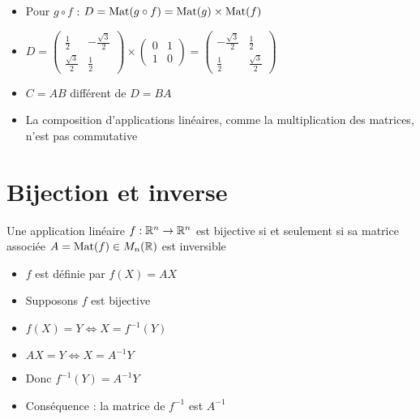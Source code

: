 \begin{frame}
\begin{exemple}
\begin{itemize}[<+->]\setlength{\itemsep}{8pt}
  \item Pour $g\circ f$ : $D = \mathop{\text{Mat}}\nolimits (g \circ f)  = \mathop{\text{Mat}}\nolimits (g) \times \mathop{\text{Mat}}\nolimits (f)$
  \item $D = \begin{pmatrix} \frac12 & -\frac{\sqrt3}{2} \\ \frac{\sqrt3}{2} & \frac12 \end{pmatrix}
 \times  \begin{pmatrix} 0 & 1 \\ 1 & 0 \end{pmatrix}
= \begin{pmatrix}-\frac{\sqrt3}{2} & \frac12 \\  \frac12 & \frac{\sqrt3}{2} \end{pmatrix}
$
  \item $C=AB$ différent de $D=BA$
  \item La composition d'applications linéaires, 
  comme la multiplication des matrices, n'est pas commutative
\end{itemize}
\end{exemple} 
\end{frame}

\section{Bijection et inverse}

\begin{frame}

\begin{theoreme}
\label{th:matinv}
Une application linéaire $f : \mathbb{R}^n \to \mathbb{R}^n$ est bijective
si et seulement si sa matrice associée $A= \mathop{\text{Mat}}\nolimits(f) \in M_n(\mathbb{R})$ 
est inversible
\end{theoreme}

\pause
{}

\pause

\begin{itemize}[<+->]
  \item $f$ est définie par $f(X) = AX$
  \item Supposons $f$ est bijective
  \item $f(X)=Y \iff X = f^{-1}(Y)$
  \item $AX=Y \iff X = A^{-1}Y$
  \item Donc $f^{-1}(Y)=A^{-1}Y$
  \item Conséquence : la matrice de $f^{-1}$ est $A^{-1}$
\end{itemize}
\end{frame}


